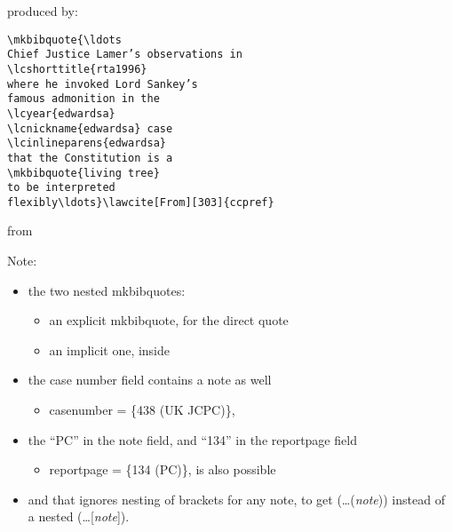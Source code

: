 \newpage
{
\lcsetstylemcgill
{}
}

\bigskip
produced by:

\bigskip
\begin{magpar}
\begin{verbatim}
\mkbibquote{\ldots 
Chief Justice Lamer’s observations in 
\lcshorttitle{rta1996} 
where he invoked Lord Sankey’s 
famous admonition in the 
\lcyear{edwardsa} 
\lcnickname{edwardsa} case 
\lcinlineparens{edwardsa} 
that the Constitution is a 
\mkbibquote{living tree} 
to be interpreted 
flexibly\ldots}\lawcite[From][303]{ccpref}
\end{verbatim}
\end{magpar}

\bigskip
from


\bigskip
Note:
\begin{itemize}
\item the two nested mkbibquotes:
\begin{itemize}
\item an explicit mkbibquote, for the direct quote
\item an implicit one, inside 
\end{itemize}
\item the case number field contains a note as well 
\begin{itemize}
\item {\ttfamily casenumber = \{438 (UK JCPC)\},}
\end{itemize}
\item the ``PC'' in the note field, and ``134'' in the reportpage field
\begin{itemize}
\item {\ttfamily reportpage = \{134 (PC)\},} is also possible
\end{itemize}
\item and that  ignores nesting of brackets for any note, to get (\ldots (\textit{note})) instead of a nested (\ldots [\textit{note}]).
\end{itemize}


